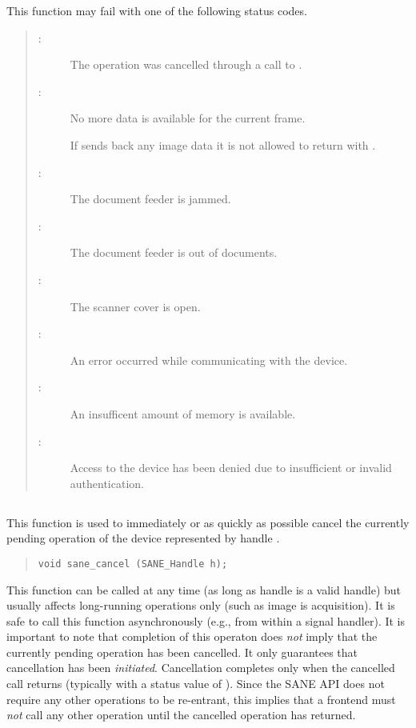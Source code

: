 \documentclass[11pt,DVIps]{report}
\begin{document}
This function may fail with one of the following status codes.
\begin{quote}
\begin{description}
\item[:] The operation was cancelled through
  a call to .
\item[:] No more data is available for the
  current frame.
\begin{changebar}
If  sends back any image data it
is not allowed to return with .
\end{changebar}
\item[:] The document feeder is jammed.
\item[:] The document feeder is out of
  documents.
\item[:] The scanner cover is open.
\item[:] An error occurred while communicating
  with the device.
\item[:] An insufficent amount of memory
  is available.
\item[:] Access to the device has
  been denied due to insufficient or invalid authentication.
\end{description}
\end{quote}


\subsection{}

This function is used to immediately or as quickly as possible cancel
the currently pending operation of the device represented by handle
.
\begin{quote}
\begin{verbatim}
void sane_cancel (SANE_Handle h);
\end{verbatim}
\end{quote}
This function can be called at any time (as long as handle  is
a valid handle) but usually affects long-running operations only (such
as image is acquisition).  It is safe to call this function
asynchronously (e.g., from within a signal handler).  It is important
to note that completion of this operaton does {\em not\/} imply that
the currently pending operation has been cancelled.  It only
guarantees that cancellation has been {\em initiated}.  Cancellation
completes only when the cancelled call returns (typically with a
status value of ).  Since the SANE API
does not require any other operations to be re-entrant, this implies
that a frontend must {\em not\/} call any other operation until the
cancelled operation has returned.
\end{document}
